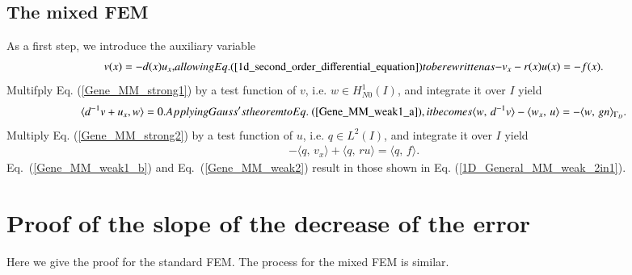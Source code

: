 \documentclass[review,3p]{elsarticle}
\begin{document}
\subsection{The mixed FEM}		\label{derivation_weak_form_MM}
As a first step, we introduce the auxiliary variable
\begin{subequations}
\begin{align}
   v(x) = - d(x)u_x, \label{Gene_MM_strong1} 
\end{align}  
allowing Eq. (\ref{1d_second_order_differential_equation}) to be rewritten as
\begin{align}
  -v_x - r(x)u(x) = -f(x).  \label{Gene_MM_strong2}
\end{align}	\label{1D_general_MM_2in1}%
\end{subequations}
Multifply Eq. (\ref{Gene_MM_strong1}) by a test function of $v$, i.e. $w \in H _{N0}^{1}(I)$, and integrate it over $I$ yield
\begin{subequations}
\begin{align}
  \langle d^{-1}v + u _x, w \rangle = 0.	\label{Gene_MM_weak1_a}
\end{align}
Applying Gauss's theorem to Eq.~(\ref{Gene_MM_weak1_a}), it becomes
\begin{align}
 \langle w, \, d^{-1}v \rangle - \langle w_x, \,  u \rangle = -\langle w, \, g n\rangle_{\Gamma_D}.		\label{Gene_MM_weak1_b}
\end{align}				\label{Gene_MM_weak1}%
\end{subequations}
Multiply Eq. (\ref{Gene_MM_strong2}) by a test function of $u$, i.e. $q \in L^2 (I)$, and integrate it over $I$ yield
\begin{align}
- \langle q , \, v_x \rangle + \langle q, \, ru \rangle = \langle q, \, f \rangle. \label{Gene_MM_weak2}
\end{align}
Eq.~(\ref{Gene_MM_weak1_b}) and Eq.~({\ref{Gene_MM_weak2}}) result in those shown in Eq. (\ref{1D_General_MM_weak_2in1}).

\section{Proof of the slope of the decrease of the error}				\label{proof_slope_ET}

Here we give the proof for the standard FEM. The process for the mixed FEM is similar. 
\end{document}
